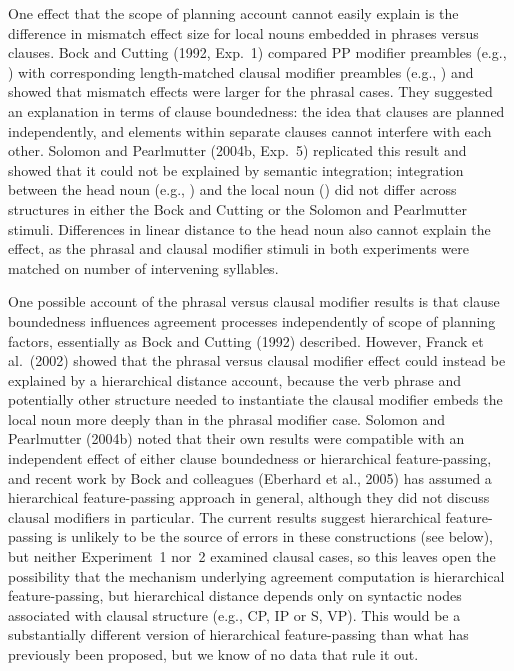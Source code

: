 \documentclass[12pt,titlepage]{article}
\newcommand{\NOTE}[1]{\textbf{*** #1 ***}}  %
\newcommand{\IGNORE}[1]{} %
\begin{document}
One effect that the scope of planning account cannot easily explain is the
difference in mismatch effect size for local nouns embedded in phrases
versus clauses.  Bock and Cutting (1992, Exp.~1) compared PP modifier
preambles (e.g., ) with
corresponding length-matched clausal modifier preambles (e.g., ) and showed that mismatch effects were
larger for the phrasal cases.  They suggested an explanation in terms of
clause boundedness: the idea that clauses are planned independently, and
elements within separate clauses cannot interfere with each other.  Solomon
and Pearlmutter (2004b, Exp.~5) replicated this result and showed that it
could not be explained by semantic integration; integration between the
head noun (e.g., ) and the local noun () did not
differ across structures in either the Bock and Cutting or the Solomon and
Pearlmutter stimuli.  Differences in linear distance to the head noun also
cannot explain the effect, as the phrasal and clausal modifier stimuli in
both experiments were matched on number of intervening syllables.

One possible account of the phrasal versus clausal modifier results is that
clause boundedness influences agreement processes independently of scope of
planning factors, essentially as Bock and Cutting (1992) described.
However, Franck et al.\ (2002) showed that the phrasal versus clausal
modifier effect could instead be explained by a hierarchical distance
account, because the verb phrase and potentially other structure needed to
instantiate the clausal modifier embeds the local noun more deeply than in
the phrasal modifier case.  Solomon and Pearlmutter (2004b) noted that
their own results were compatible with an independent effect of either
clause boundedness or hierarchical feature-passing, and recent work by Bock
and colleagues (Eberhard et al., 2005) has assumed a hierarchical
feature-passing approach in general, although they did not discuss clausal
modifiers in particular.  The current results suggest hierarchical
feature-passing is unlikely to be the source of errors in these
constructions (see below), but neither Experiment~1 nor~2 examined clausal
cases, so this leaves open the possibility that the mechanism underlying
agreement computation is hierarchical feature-passing, but hierarchical
distance depends only on syntactic nodes associated with clausal structure
(e.g., CP, IP or S, VP)\@.  This would be a substantially different version
of hierarchical feature-passing than what has previously been proposed, but
we know of no data that rule it out.\IGNORE{ \NOTE{I'm tempted to leave
this out, b/c we're just speculating at this point, and there's really
nothing to refer to yet\ldots} A third possible explanation for the phrasal
versus clausal modifier result is that the nature of the semantic
relationship established between two elements linked with a function word
(e.g., prepositions) and a content word (e.g., lexical verb) is
qualitatively different.  To date, all published studies examining the
interference effects of local nouns in clausal modifiers have used lexical
verbs in RCs, and the possible difference between prepositions and lexical
verbs may affects timing of planning of local nouns.}
\end{document}
